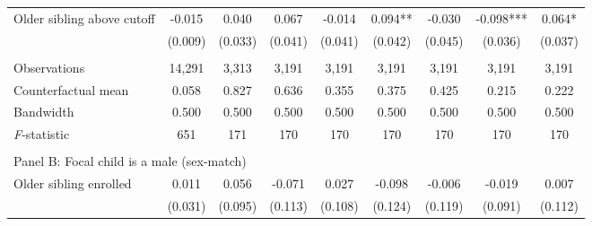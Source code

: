 \begin{table}[!htbp]
{{\begin{tabular}{lcccccccc}
Older sibling above cutoff&      -0.015   &       0.040   &       0.067   &      -0.014   &       0.094** &      -0.030   &      -0.098***&       0.064*  \\
                    &     (0.009)   &     (0.033)   &     (0.041)   &     (0.041)   &     (0.042)   &     (0.045)   &     (0.036)   &     (0.037)   \\
                    &               &               &               &               &               &               &               &               \\
Observations        &      14,291   &       3,313   &       3,191   &       3,191   &       3,191   &       3,191   &       3,191   &       3,191   \\
Counterfactual mean &       0.058   &       0.827   &       0.636   &       0.355   &       0.375   &       0.425   &       0.215   &       0.222   \\
Bandwidth           &       0.500   &       0.500   &       0.500   &       0.500   &       0.500   &       0.500   &       0.500   &       0.500   \\
\textit{F}-statistic&         651   &         171   &         170   &         170   &         170   &         170   &         170   &         170   \\
 
&  &  &  & & & & & \\
\multicolumn{10}{l}{Panel B: Focal child is a male (sex-match)} \\
Older sibling enrolled&       0.011   &       0.056   &      -0.071   &       0.027   &      -0.098   &      -0.006   &      -0.019   &       0.007   \\
                    &     (0.031)   &     (0.095)   &     (0.113)   &     (0.108)   &     (0.124)   &     (0.119)   &     (0.091)   &     (0.112)   \\
 

\end{tabular}}}
\end{table}
